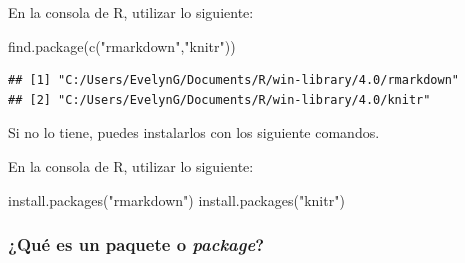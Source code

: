 \documentclass[
]{article}
\newenvironment{Shaded}{\begin{snugshade}}{\end{snugshade}}
\newcommand{\FunctionTok}[1]{\textcolor[rgb]{0.00,0.00,0.00}{#1}}
\newcommand{\NormalTok}[1]{#1}
\newcommand{\StringTok}[1]{\textcolor[rgb]{0.31,0.60,0.02}{#1}}
\begin{document}
En la consola de R, utilizar lo siguiente:

\begin{Shaded}
\begin{Highlighting}[]
\FunctionTok{find.package}\NormalTok{(}\FunctionTok{c}\NormalTok{(}\StringTok{"rmarkdown"}\NormalTok{,}\StringTok{"knitr"}\NormalTok{))}
\end{Highlighting}
\end{Shaded}

\begin{verbatim}
## [1] "C:/Users/EvelynG/Documents/R/win-library/4.0/rmarkdown"
## [2] "C:/Users/EvelynG/Documents/R/win-library/4.0/knitr"
\end{verbatim}

Si no lo tiene, puedes instalarlos con los siguiente comandos.

En la consola de R, utilizar lo siguiente:

\begin{Shaded}
\begin{Highlighting}[]
\FunctionTok{install.packages}\NormalTok{(}\StringTok{"rmarkdown"}\NormalTok{)}
\FunctionTok{install.packages}\NormalTok{(}\StringTok{"knitr"}\NormalTok{)}
\end{Highlighting}
\end{Shaded}

\hypertarget{quuxe9-es-un-paquete-o-package}{%
\subsubsection{\texorpdfstring{¿Qué es un paquete o
\emph{package}?}{¿Qué es un paquete o package?}}\label{quuxe9-es-un-paquete-o-package}}
\end{document}
